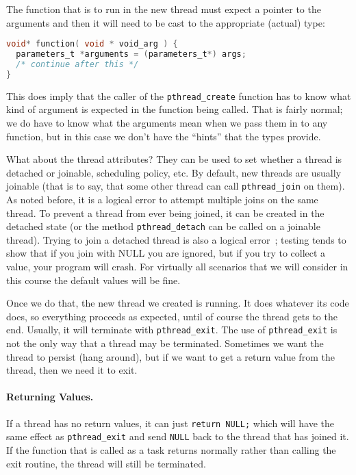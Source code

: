 The function that is to run in the new thread must expect a pointer to the arguments and then it will need to be cast to the appropriate (actual) type:
\begin{lstlisting}[language=C]
void* function( void * void_arg ) {
  parameters_t *arguments = (parameters_t*) args;
  /* continue after this */
}
\end{lstlisting}

This does imply that the caller of the \texttt{pthread\_create} function has to know what kind of argument is expected in the function being called. That is fairly normal; we do have to know what the arguments mean when we pass them in to any function, but in this case we don't have the ``hints'' that the types provide.

What about the thread attributes? They can be used to set whether a thread is detached or joinable, scheduling policy, etc. By default, new threads are usually joinable (that is to say, that some other thread can call \texttt{pthread\_join} on them). As noted before, it is a logical error to attempt multiple joins on the same thread. To prevent a thread from ever being joined, it can be created in the detached state (or the method \texttt{pthread\_detach} can be called on a joinable thread). Trying to join a detached thread is also a logical error~\cite{pthreads}; testing tends to show that if you join with NULL you are ignored, but if you try to collect a value, your program will crash. For virtually all scenarios that we will consider in this course the default values will be fine. 

Once we do that, the new thread we created is running. It does whatever its code does, so everything proceeds as expected, until of course the thread gets to the end. Usually, it will terminate with \texttt{pthread\_exit}. The use of \texttt{pthread\_exit} is not the only way that a thread may be terminated. Sometimes we want the thread to persist (hang around), but if we want to get a return value from the thread, then we need it to exit. 

\paragraph{Returning Values.} If a thread has no return values, it can just \texttt{return NULL;} which will have the same effect as \texttt{pthread\_exit} and send \texttt{NULL} back to the thread that has joined it. If the function that is called as a task returns normally rather than calling the exit routine, the thread will still be terminated. 

